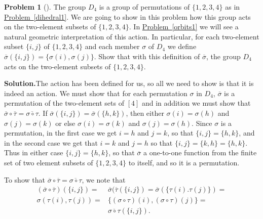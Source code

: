 \documentclass[10pt,]{book}
\theoremstyle{plain}
\theoremstyle{definition}
\newtheorem{activity}[project]{Problem}
\theoremstyle{definition}
\numberwithin{equation}{chapter}
\newcommand{\amp}{&}
\begin{document}
\begin{activity}[]\label{D_4on2-sets}
The group \(D_4\) is a group of permutations of \(\{1,2,3,4\}\) as in \hyperref[dihedral1]{Problem~\ref{dihedral1}}. We are going to show in this problem how this group acts on the two-element subsets of \(\{1,2,3,4\}\). In \hyperref[orbits1]{Problem~\ref{orbits1}} we will see a natural geometric interpretation of this action. In particular, for each two-element subset \(\{i,j\}\) of \(\{1,2,3,4\}\) and each member \(\sigma\) of \(D_4\) we define \(\overline{\sigma}(\{i,j\}) = \{\sigma(i),\sigma(j)\}\).  Show that with this definition of \(\overline{\sigma}\), the group \(D_4\) acts on the two-element subsets of \(\{1,2,3,4\}\).%
\par\medskip\noindent%
\textbf{Solution.}\quad The action has been defined for us, so all we need to show is that it is indeed an action. We must show that for each permutation \(\sigma\) in \(D_4\), \(\overline{\sigma}\) is a permutation of the two-element sets of \([4]\) and in addition we must show that \(\overline{\sigma}\circ\overline{\tau}= \overline{\sigma\circ\tau}\). If \(\overline{\sigma}(\{i,j\})=\overline{\sigma}(\{h,k\})\), then either \(\sigma(i)=\sigma(h)\) and \(\sigma(j)=\sigma(k)\) or else \(\sigma(i)=\sigma(k)\) and \(\sigma(j) =\sigma(h)\). Since \(\sigma\) is a permutation, in the first case we get \(i=h\) and \(j=k\), so that \(\{i,j\}= \{h,k\}\), and in the second case we get that \(i=k\) and \(j=h\) so that \(\{i,j\} = \{k,h\} =\{h,k\}\). Thus in either case \(\{i,j\} = \{h,k\}\), so that \(\overline{\sigma}\) a one-to-one function from the finite set of two element subsets of \(\{1,2,3,4\}\) to itself, and so it is a permutation.%
\par
To show that \(\overline{\sigma}\circ\overline{\tau} = \overline{\sigma\circ\tau}\), we note that%
\begin{align*}
(\overline{\sigma}\circ\overline{\tau})(\{i,j\})  =\amp
\overline{\sigma}(\overline{\tau}(\{i,j\})=\overline{\sigma}(\{\tau(i).
\tau(j)\})=\\
\sigma({\tau(i),\tau(j)}) =\amp \{(\sigma\circ\tau)(i),(\sigma\circ\tau)(j)\} =\\
\amp \overline{\sigma\circ\tau}(\{i,j\})\text{.}
\end{align*}
%
\end{activity}
\end{document}
